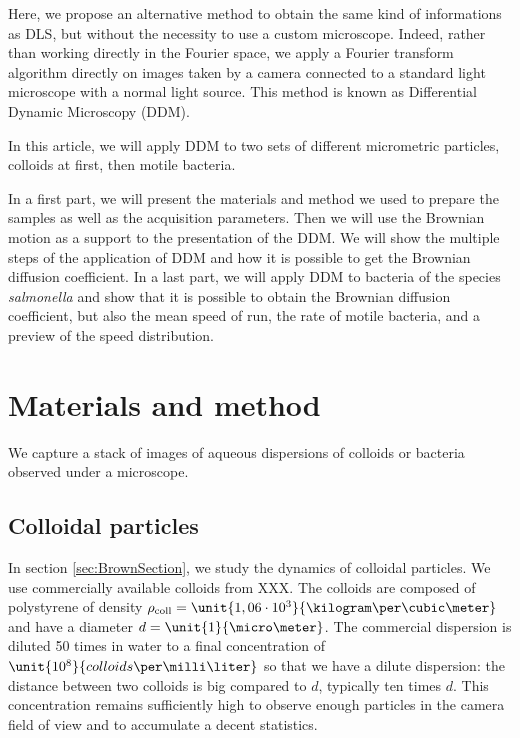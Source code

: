 \documentclass[%
 aip,
 jmp,%
 amsmath,amssymb,
reprint,%
]{revtex4-1}
\begin{document}
 

Here, we propose an alternative method to obtain the same kind of informations as DLS, but without the necessity to use a custom microscope. Indeed, rather than working directly in the Fourier space, we apply a Fourier transform algorithm directly on images taken by a camera connected to a standard light microscope with a normal light source. This method is known as Differential Dynamic Microscopy (DDM).

In this article, we will apply DDM to two sets of different micrometric particles, colloids at first, then motile bacteria.

 

In a first part, we will present the materials and method we used to prepare the samples as well as the acquisition parameters. Then we will use the Brownian motion as a support to the presentation of the DDM. We will show the multiple steps of the application of DDM and how it is possible to get the Brownian diffusion coefficient. In a last part, we will apply DDM to bacteria of the species \textit{salmonella} and show that it is possible to obtain the Brownian diffusion coefficient, but also the mean speed of run, the rate of motile bacteria, and a preview of the speed distribution.

\section{Materials and method}

We capture a stack of images of aqueous dispersions of colloids or bacteria observed under a microscope.

\subsection{Colloidal particles}

In section \ref{sec:BrownSection}, we study the dynamics of colloidal particles. We use commercially available colloids from XXX. The colloids are composed of polystyrene of density $\rho_\text{coll} = \unit{1,06\cdot10^3}{\kilogram\per\cubic\meter}$ and have a diameter $d = \unit{1}{\micro\meter}$. The commercial dispersion is diluted 50 times in water to a final concentration of $\unit{10^8}{colloids\per\milli\liter}$ so that we have a dilute dispersion: the distance between two colloids is big compared to $d$, typically ten times $d$. This concentration remains sufficiently high to observe enough particles in the camera field of view and to accumulate a decent statistics.
\end{document}
